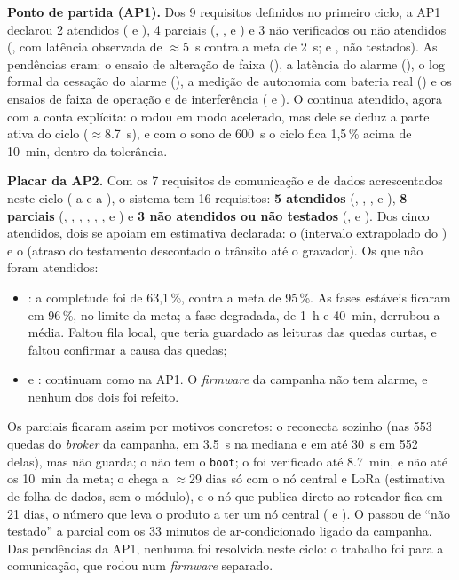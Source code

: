 \textbf{Ponto de partida (AP1).} Dos 9 requisitos definidos no primeiro
ciclo, a AP1 declarou 2 atendidos ( e ), 4 parciais
(, ,  e ) e 3 não verificados ou não
atendidos (, com latência observada de $\approx$\SI{5}{\second}
contra a meta de \SI{2}{\second};  e , não testados). As
pendências eram: o ensaio de alteração de faixa (), a latência do
alarme (), o log formal da cessação do alarme (), a
medição de autonomia com bateria real () e os ensaios de faixa de
operação e de interferência ( e ). O  continua
atendido, agora com a conta explícita: o  rodou em modo
acelerado, mas dele se deduz a parte ativa do ciclo ($\approx$\SI{8,7}{\second}),
e com o sono de \SI{600}{\second} o ciclo fica 1,5\,\% acima de
\SI{10}{\minute}, dentro da tolerância.

\textbf{Placar da AP2.} Com os 7 requisitos de comunicação e de dados
acrescentados neste ciclo ( a  e  a ), o
sistema tem 16 requisitos: \textbf{5 atendidos} (, ,
,  e ), \textbf{8 parciais} (, ,
, , , ,  e ) e \textbf{3
não atendidos ou não testados} (,  e ). Dos
cinco atendidos, dois se apoiam em estimativa declarada: o 
(intervalo extrapolado do ) e o  (atraso do testamento
descontado o trânsito até o gravador). Os que não foram atendidos:

\begin{itemize}
  \item {}: a completude foi de 63,1\,\%, contra a meta de
    95\,\%. As fases estáveis ficaram em 96\,\%, no limite da meta; a
    fase degradada, de \SI{1}{\hour} e \SI{40}{\minute}, derrubou a
    média. Faltou fila local, que teria guardado as leituras das quedas
    curtas, e faltou confirmar a causa das quedas;
  \item {} e : continuam como na AP1. O \emph{firmware}
    da campanha não tem alarme, e nenhum dos dois foi refeito.
\end{itemize}

\noindent Os parciais ficaram assim por motivos concretos: o 
reconecta sozinho (nas 553 quedas do \emph{broker} da campanha, em
\SI{3,5}{\second} na mediana e em até \SI{30}{\second} em 552 delas),
mas não guarda; o  não tem o \texttt{boot}; o  foi verificado até
\SI{8,7}{\minute}, e não até os \SI{10}{\minute} da meta; o 
chega a $\approx$29 dias só com o nó central e LoRa (estimativa de
folha de dados, sem o módulo), e o nó que publica direto ao roteador
fica em 21 dias, o número que leva o produto a ter um nó central
( e ). O  passou de \enquote{não testado} a parcial com os
33 minutos de ar-condicionado ligado da campanha. Das pendências da AP1,
nenhuma foi resolvida neste ciclo: o trabalho foi
para a comunicação, que rodou num \emph{firmware} separado.

